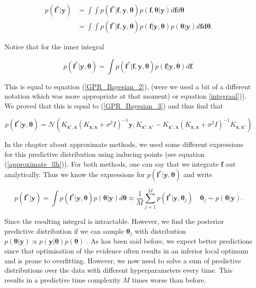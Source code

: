 \documentclass[12pt,a4paper,oneside]{book}
\begin{document}
\begin{align}
p(\bm{f}^{\ast} | \bm{y} ) &= \int \int p(\bm{f}^{\ast} | \bm{f}, \bm{y} ,  \bm{\theta}) p(\bm{f} ,  \bm{\theta}| \bm{y} ) d \bm{f} d\bm{\theta} \nonumber \\
 &= \int  \int p(\bm{f}^{\ast} | \bm{f}, \bm{y} ,  \bm{\theta}) p(\bm{f} | \bm{y} ,  \bm{\theta}) p( \bm{\theta}| \bm{y} )d \bm{f} \bm{d \theta}.
\end{align}

Notice that for the inner integral 

\begin{equation}
p (\bm{f}^{\ast} | \bm{y}, \bm{\theta}) = \int  p(\bm{f}^{\ast} | \bm{f}, \bm{y} ,  \bm{\theta}) p(\bm{f} | \bm{y} ,  \bm{\theta}) d \bm{f}.
\end{equation}

This is equal to equation (\ref{GPR_Bayesian_2}), (were we used a bit of a different notation which was more appropriate at that moment) or equation \ref{integraal})). We proved that this is equal to (\ref{GPR_Bayesian_3}) and thus find that 

\begin{equation}
p (\bm{f}^{\ast} | \bm{y}, \bm{\theta}) = \mathcal{N}(K_{\bm{x}^{\ast}, \bm{x}}(K_{\bm{x}, \bm{x}} + \sigma^2 I)^{-1} \bm{y} , K_{\bm{x}^{\ast}, \bm{x}^{\ast}} - K_{\bm{x}^{\ast}, \bm{x}} (K_{\bm{x}, \bm{x}} + \sigma^2 I)^{-1} K_{ \bm{x},\bm{x}^{\ast}})
\end{equation}

In the chapter about approximate methods, we used some different expressions for this predictive distribution using inducing points (see equation (\ref{approximate_llh})). For both methods, one can say that we integrate $\bm{f}$ out analytically. Thus we know the expressions for $ p( \bm{f}^{\ast} | \bm{y}, \bm{\theta})$ and write

\begin{equation}\label{full_bayesian}
p (\bm{f}^{\ast} | \bm{y} ) = \int p( \bm{f}^{\ast} | \bm{y}, \bm{\theta}) p (\bm{\theta} | \bm{y} ) d \bm{\theta} \approx \dfrac{1}{M} \sum\limits_{j=1}^{M} p( \bm{f}^{\ast} | \bm{y} , \bm{\theta}_j)  \quad \bm{\theta}_j \sim p(\bm{\theta}|\bm{y}).
\end{equation}

Since the resulting integral is intractable. However, we find the posterior predictive distribution if we can sample $\bm{\theta}_j $ with distribution $p(\bm{\theta}|\bm{y}) \propto p(\bm{y}| \bm{\theta}) p(\bm{\theta})$ . As has been said before, we expect better predictions since that optimisation of the evidence often results in an inferior local optimum and is prone to overfitting. However, we now need to solve a sum of predictive distributions over the data with different hyperparameters every time. This results in a predictive time complexity $M$ times worse than before.
\end{document}
